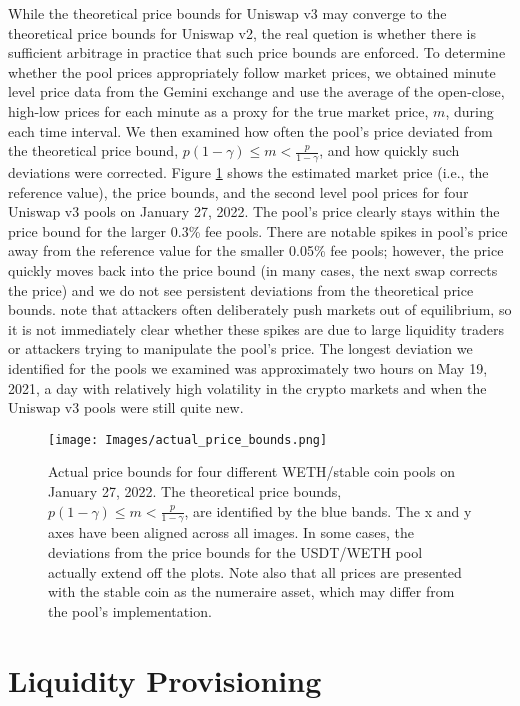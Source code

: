 \documentclass[11pt]{article}
\begin{document}
While the theoretical price bounds for Uniswap v3 may converge to the theoretical price bounds for Uniswap v2, the real quetion is whether there is sufficient arbitrage in practice that such price bounds are enforced. To determine whether the pool prices appropriately follow market prices, we obtained minute level price data from the Gemini exchange and use the average of the open-close, high-low prices for each minute as a proxy for the true market price, $m$, during each time interval. We then examined how often the pool's price deviated from the theoretical price bound, $p (1 - \gamma) \le m < \frac{p}{1 - \gamma}$, and how quickly such deviations were corrected. Figure \ref{fig:actual_price_bounds} shows the estimated market price (i.e., the reference value), the price bounds, and the second level pool prices for four Uniswap v3 pools on January 27, 2022. The pool's price clearly stays within the price bound for the larger 0.3\% fee pools. There are notable spikes in pool's price away from the reference value for the smaller 0.05\% fee pools; however, the price quickly moves back into the price bound (in many cases, the next swap corrects the price) and we do not see persistent deviations from the theoretical price bounds. \citet{Lehar2021DecentralizedE} note that attackers often deliberately push markets out of equilibrium, so it is not immediately clear whether these spikes are due to large liquidity traders or attackers trying to manipulate the pool's price. The longest deviation we identified for the pools we examined was approximately two hours on May 19, 2021, a day with relatively high volatility in the crypto markets and when the Uniswap v3 pools were still quite new.

\begin{figure}[H]
    \centering
    \texttt{[image: Images/actual\_price\_bounds.png]}
    \caption{Actual price bounds for four different WETH/stable coin pools on January 27, 2022. The theoretical price bounds, $p (1 - \gamma) \le m < \frac{p}{1 - \gamma}$, are identified by the blue bands. The x and y axes have been aligned across all images. In some cases, the deviations from the price bounds for the USDT/WETH pool actually extend off the plots. Note also that all prices are presented with the stable coin as the numeraire asset, which may differ from the pool's implementation.}
    \label{fig:actual_price_bounds}
\end{figure}

\section{Liquidity Provisioning}\label{sec:4}
\end{document}
